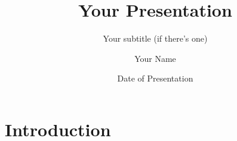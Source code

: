 \documentclass[10pt,xcolor={table,dvipsnames},t]{beamer}
\title[Your Short Title]{Your Presentation}
\subtitle{Your subtitle (if there's one)}
\author{Your Name}
\institute{Your Faculty/Department}
\date{Date of Presentation}
\begin{document}
\begin{frame}
  \titlepage
\end{frame}

\section{Introduction}
\end{document}
